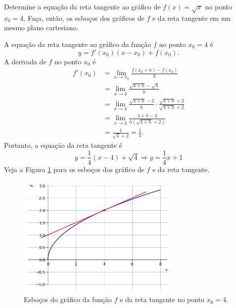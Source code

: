 \cleardoublepage\documentclass[../main.tex]{subfiles}
\begin{document}
\begin{exeresol}
  Determine a equação da reta tangente ao gráfico de $f(x) = \sqrt{x}$ no ponto $x_0=4$. Faça, então, os esboços dos gráficos de $f$ e da reta tangente em um mesmo plano cartesiano.
\end{exeresol}
\begin{resol}
  A equação da reta tangente ao gráfico da função $f$ no ponto $x_0=4$ é
  \begin{equation}
    y = f'(x_0)(x-x_0)+f(x_0).
  \end{equation}
  A derivada de $f$ no ponto $x_0$ é
  \begin{align*}
    f'(x_0) &= \lim_{x\to x_0} \frac{f(x_0+h)-f(x_0)}{h}\\
            &= \lim_{x\to 4} \frac{\sqrt{4+h}-\sqrt{4}}{h}\\
            &= \lim_{x\to 4} \frac{\sqrt{4+h}-2}{h} \cdot \frac{\sqrt{4+h}+2}{\sqrt{4+h}+2}\\
            &= \lim_{x\to 4} \frac{4+h-4}{h(\sqrt{4+h}+2)}\\
            &= \frac{1}{\sqrt{4}+2} = \frac{1}{4}.
  \end{align*}
  Portanto, a equação da reta tangente é
  \begin{equation*}
    y = \frac{1}{4}(x-4)+\sqrt{4} \Rightarrow y = \frac{1}{4}x+1
  \end{equation*}
  Veja a Figura \ref{fig:cap_deriv_exeresol_rt_sqrt} para os esboços dos gráfico de $f$ e da reta tangente.

  \begin{figure}[H]
    \centering
    \includegraphics[width=0.7\textwidth]{fig_deriv/fig_cap_deriv_exeresol_rt_sqrt}
    \caption{Esboços do gráfico da função $f$ e da reta tangente no ponto $x_0=4$.}
    \label{fig:cap_deriv_exeresol_rt_sqrt}
  \end{figure}
\end{resol}
\end{document}
